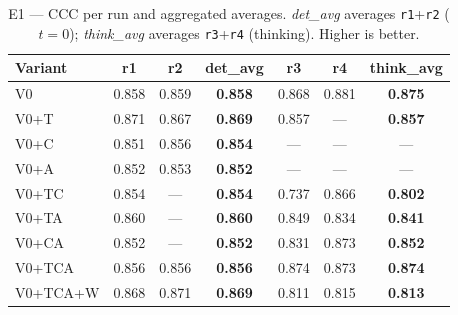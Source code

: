 \begin{table}[t]
  \centering
  \caption{E1 --- CCC per run and aggregated averages.
    \emph{det\_avg} averages \texttt{r1}+\texttt{r2} ($t=0$);
    \emph{think\_avg} averages \texttt{r3}+\texttt{r4} (thinking).
    Higher is better.}
  \label{tab:e1-ccc}
  \small
  \begin{tabular*}{\linewidth}{@{\extracolsep{\fill}}lcccccc@{}}
    \toprule
    Variant & r1 & r2 & \textbf{det\_avg} & r3 & r4 & \textbf{think\_avg}\\
    \midrule
    V0        & 0.858 & 0.859 & \textbf{0.858} & 0.868 & 0.881 & \textbf{0.875}\\
    V0+T      & 0.871 & 0.867 & \textbf{0.869} & 0.857 & ---   & \textbf{0.857}\\
    V0+C      & 0.851 & 0.856 & \textbf{0.854} & ---   & ---   & ---\\
    V0+A      & 0.852 & 0.853 & \textbf{0.852} & ---   & ---   & ---\\
    V0+TC     & 0.854 & ---   & \textbf{0.854} & 0.737 & 0.866 & \textbf{0.802}\\
    V0+TA     & 0.860 & ---   & \textbf{0.860} & 0.849 & 0.834 & \textbf{0.841}\\
    V0+CA     & 0.852 & ---   & \textbf{0.852} & 0.831 & 0.873 & \textbf{0.852}\\
    V0+TCA    & 0.856 & 0.856 & \textbf{0.856} & 0.874 & 0.873 & \textbf{0.874}\\
    V0+TCA+W  & 0.868 & 0.871 & \textbf{0.869} & 0.811 & 0.815 & \textbf{0.813}\\
    \bottomrule
  \end{tabular*}
\end{table}

